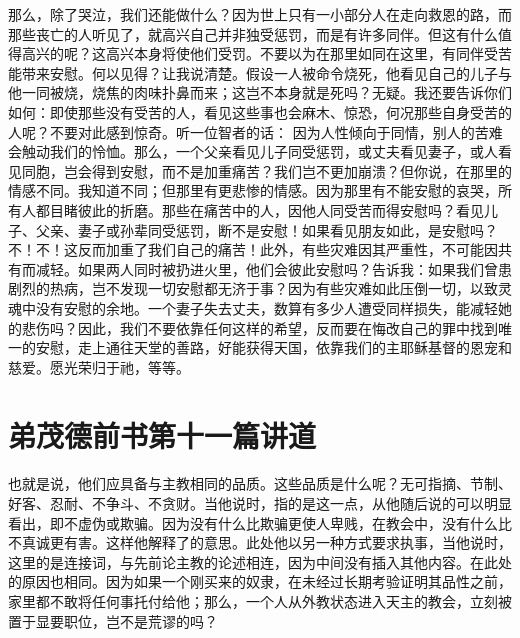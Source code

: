 那么，除了哭泣，我们还能做什么？因为世上只有一小部分人在走向救恩的路，而那些丧亡的人听见了，就高兴自己并非独受惩罚，而是有许多同伴。但这有什么值得高兴的呢？这高兴本身将使他们受罚。不要以为在那里如同在这里，有同伴受苦能带来安慰。何以见得？让我说清楚。假设一人被命令烧死，他看见自己的儿子与他一同被烧，烧焦的肉味扑鼻而来；这岂不本身就是死吗？无疑。我还要告诉你们如何：即使那些没有受苦的人，看见这些事也会麻木、惊恐，何况那些自身受苦的人呢？不要对此感到惊奇。听一位智者的话： 因为人性倾向于同情，别人的苦难会触动我们的怜恤。那么，一个父亲看见儿子同受惩罚，或丈夫看见妻子，或人看见同胞，岂会得到安慰，而不是加重痛苦？我们岂不更加崩溃？但你说，在那里的情感不同。我知道不同；但那里有更悲惨的情感。因为那里有不能安慰的哀哭，所有人都目睹彼此的折磨。那些在痛苦中的人，因他人同受苦而得安慰吗？看见儿子、父亲、妻子或孙辈同受惩罚，断不是安慰！如果看见朋友如此，是安慰吗？不！不！这反而加重了我们自己的痛苦！此外，有些灾难因其严重性，不可能因共有而减轻。如果两人同时被扔进火里，他们会彼此安慰吗？告诉我：如果我们曾患剧烈的热病，岂不发现一切安慰都无济于事？因为有些灾难如此压倒一切，以致灵魂中没有安慰的余地。一个妻子失去丈夫，数算有多少人遭受同样损失，能减轻她的悲伤吗？因此，我们不要依靠任何这样的希望，反而要在悔改自己的罪中找到唯一的安慰，走上通往天堂的善路，好能获得天国，依靠我们的主耶稣基督的恩宠和慈爱。愿光荣归于祂，等等。\par



\section{弟茂德前书第十一篇讲道}

\par

\par

也就是说，他们应具备与主教相同的品质。这些品质是什么呢？无可指摘、节制、好客、忍耐、不争斗、不贪财。当他说时，指的是这一点，从他随后说的可以明显看出，即不虚伪或欺骗。因为没有什么比欺骗更使人卑贱，在教会中，没有什么比不真诚更有害。这样他解释了的意思。此处他以另一种方式要求执事，当他说时，这里的是连接词，与先前论主教的论述相连，因为中间没有插入其他内容。在此处的原因也相同。因为如果一个刚买来的奴隶，在未经过长期考验证明其品性之前，家里都不敢将任何事托付给他；那么，一个人从外教状态进入天主的教会，立刻被置于显要职位，岂不是荒谬的吗？\par

